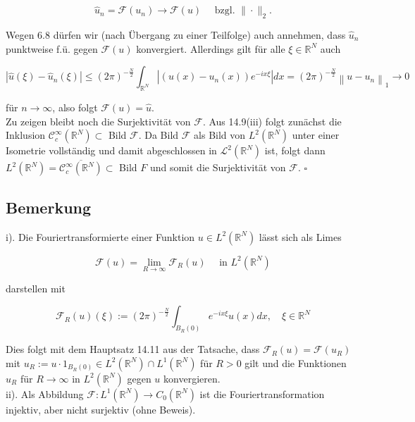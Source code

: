 \documentclass[10pt, letterpaper]{article}
\begin{document}
$$
\hat{u}_{n}=\mathcal{F}\left(u_{n}\right) \rightarrow \mathcal{F}(u) \quad \text { bzgl. }\|\cdot\|_{2} .
$$

Wegen 6.8 dürfen wir (nach Übergang zu einer Teilfolge) auch annehmen, dass $\hat{u}_{n}$ punktweise f.ü. gegen $\mathcal{F}(u)$ konvergiert. Allerdings gilt für alle $\xi \in \mathbb{R}^{N}$ auch

$$
\left|\hat{u}(\xi)-\hat{u}_{n}(\xi)\right| \leq(2 \pi)^{-\frac{N}{2}} \int_{\mathbb{R}^{N}}\left|\left(u(x)-u_{n}(x)\right) e^{-i x \xi}\right| d x=(2 \pi)^{-\frac{N}{2}}\left\|u-u_{n}\right\|_{1} \rightarrow 0
$$

für $n \rightarrow \infty$, also folgt $\mathcal{F}(u)=\hat{u}$.\\
Zu zeigen bleibt noch die Surjektivität von $\mathcal{F}$. Aus 14.9(iii) folgt zunächst die Inklusion $\mathcal{C}_{c}^{\infty}\left(\mathbb{R}^{N}\right) \subset$ Bild $\mathcal{F}$. Da Bild $\mathcal{F}$ als Bild von $L^{2}\left(\mathbb{R}^{N}\right)$ unter einer Isometrie vollständig und damit abgeschlossen in $\mathcal{L}^{2}\left(\mathbb{R}^{N}\right)$ ist, folgt dann $L^{2}\left(\mathbb{R}^{N}\right)=\overline{\mathcal{C}_{c}^{\infty}\left(\mathbb{R}^{N}\right)} \subset$ Bild $F$ und somit die Surjektivität von $\mathcal{F}$. \(\square\)

\subsection*{Bemerkung}
i). Die Fouriertransformierte einer Funktion $u \in L^{2}\left(\mathbb{R}^{N}\right)$ lässt sich als Limes

$$
\mathcal{F}(u)=\lim _{R \rightarrow \infty} \mathcal{F}_{R}(u) \quad \text { in } L^{2}\left(\mathbb{R}^{N}\right)
$$

darstellen mit

$$
\mathcal{F}_{R}(u)(\xi):=(2 \pi)^{-\frac{N}{2}} \int_{B_{R}(0)} e^{-i x \xi} u(x) d x, \quad \xi \in \mathbb{R}^{N}
$$

Dies folgt mit dem Hauptsatz 14.11 aus der Tatsache, dass $\mathcal{F}_{R}(u)=\mathcal{F}\left(u_{R}\right)$ mit $u_{R}:=u \cdot 1_{B_{R}(0)} \in L^{2}\left(\mathbb{R}^{N}\right) \cap L^{1}\left(\mathbb{R}^{N}\right)$ für $R>0$ gilt und die Funktionen $u_{R}$ für $R \rightarrow \infty$ in $L^{2}\left(\mathbb{R}^{N}\right)$ gegen $u$ konvergieren.\\
ii). Als Abbildung $\mathcal{F}: L^{1}\left(\mathbb{R}^{N}\right) \rightarrow C_{0}\left(\mathbb{R}^{N}\right)$ ist die Fouriertransformation injektiv, aber nicht surjektiv (ohne Beweis).
\end{document}
